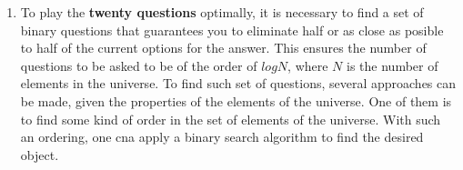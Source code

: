 \documentclass{article}
\begin{document}
\begin{enumerate}
	\item To play the \textbf{twenty questions} optimally, it is necessary to find a set of binary questions that guarantees you to eliminate half or as close as posible to half of the current options for the answer. This ensures the number of questions to be asked to be of the order of \(log N\), where \(N\) is the number of elements in the universe. To find such set of questions, several approaches can be made, given the properties of the elements of the universe. One of them is to find some kind of order in the set of elements of the universe. With such an ordering, one cna apply a binary search algorithm to find the desired object.
\end{enumerate}


\end{document}
